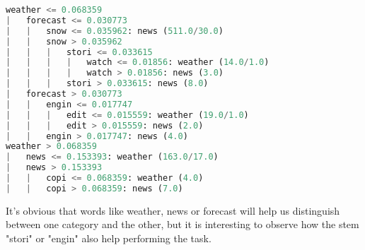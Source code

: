 \begin{lstlisting}[language=Python]
weather <= 0.068359
|   forecast <= 0.030773
|   |   snow <= 0.035962: news (511.0/30.0)
|   |   snow > 0.035962
|   |   |   stori <= 0.033615
|   |   |   |   watch <= 0.01856: weather (14.0/1.0)
|   |   |   |   watch > 0.01856: news (3.0)
|   |   |   stori > 0.033615: news (8.0)
|   forecast > 0.030773
|   |   engin <= 0.017747
|   |   |   edit <= 0.015559: weather (19.0/1.0)
|   |   |   edit > 0.015559: news (2.0)
|   |   engin > 0.017747: news (4.0)
weather > 0.068359
|   news <= 0.153393: weather (163.0/17.0)
|   news > 0.153393
|   |   copi <= 0.068359: weather (4.0)
|   |   copi > 0.068359: news (7.0)
\end{lstlisting}
It's obvious that words like weather, news or forecast will help us distinguish between one category and the other, but it is interesting to observe how the stem "stori" or "engin" also help performing
the task.

